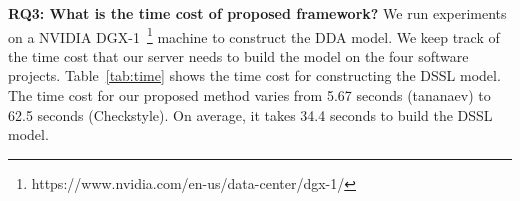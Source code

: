 \textbf{RQ3: What is the time cost of proposed framework?}
We run experiments on a NVIDIA DGX-1~\footnote{https://www.nvidia.com/en-us/data-center/dgx-1/} machine to construct the DDA model. We keep track of the time cost that our server needs to build the model on the four software projects. Table~\ref{tab:time} shows the time cost for constructing the DSSL model. The time cost for our proposed method varies from 5.67 seconds (tananaev) to 62.5 seconds (Checkstyle). On average, it takes 34.4 seconds to build the DSSL model.  




